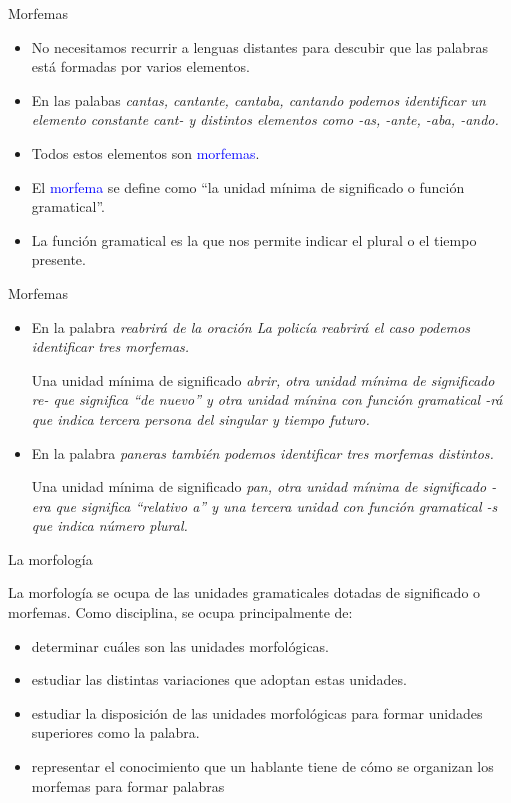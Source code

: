 \documentclass{beamer}
\begin{document}
\begin{frame}{Morfemas}

\begin{itemize}
	\item No necesitamos recurrir a lenguas distantes para descubir que las palabras está formadas por varios elementos.
	\item En las palabas \it{cantas, cantante, cantaba, cantando} podemos identificar un elemento constante \it{cant-} y distintos elementos como \it{-as, -ante, -aba, -ando}.
	\item Todos estos elementos son \textcolor{blue}{morfemas}.
	\item El \textcolor{blue}{morfema} se define como ``la unidad mínima de significado o función gramatical''. 
	\item La función gramatical es la que nos permite indicar el plural o el tiempo presente.
\end{itemize}

\end{frame}

\begin{frame}{Morfemas}

\begin{itemize}
	\item En la palabra \it{reabrirá} de la oración \it{La policía reabrirá el caso} podemos identificar tres morfemas.
	
	Una unidad mínima de significado \it{abrir}, otra unidad mínima de significado \it{re-} que significa ``de nuevo'' y otra unidad mínina con función gramatical \it{-rá} que indica tercera persona del singular y tiempo futuro. 
	
	\item En la palabra \it{paneras} también podemos identificar tres morfemas distintos.
	
	Una unidad mínima de significado \it{pan}, otra unidad mínima de significado \it{-era} que significa ``relativo a'' y una tercera unidad con función gramatical \it{-s} que indica número plural.
\end{itemize}

\end{frame}

\begin{frame}{La morfología}

La morfología se ocupa de las unidades gramaticales dotadas de significado o morfemas. Como disciplina, se ocupa principalmente de:

\begin{itemize}
	\item determinar cuáles son las unidades morfológicas.
	\item estudiar las distintas variaciones que adoptan estas unidades.
	\item estudiar la disposición de las unidades morfológicas para formar unidades superiores como la palabra.
	\item representar el conocimiento que un hablante tiene de cómo se organizan los morfemas para formar palabras
\end{itemize}

\end{frame}
\end{document}
